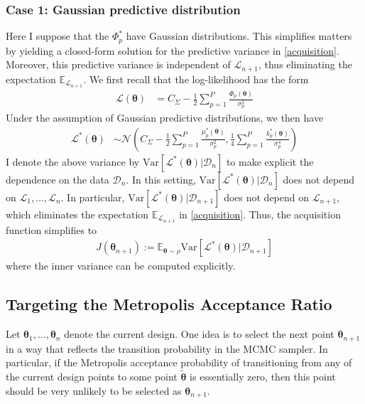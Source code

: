 \documentclass[12pt]{article}
\newcommand{\E}{\mathbb{E}}
\newcommand{\Var}{\mathrm{Var}}
\newcommand{\btheta}{\boldsymbol{\theta}}
\begin{document}
\subsubsection{Case 1: Gaussian predictive distribution}
Here I suppose that the $\Phi_p^*$ have Gaussian distributions. This simplifies matters by yielding a closed-form solution for the predictive variance in \ref{acquisition}. Moreover, 
this predictive variance is independent of $\mathcal{L}_{n+1}$, thus eliminating the expectation $\E_{\mathcal{L}_{n+1}}$. We first recall that the log-likelihood has the form 
\begin{align*}
\mathcal{L}(\btheta) &= C_\Sigma - \frac{1}{2} \sum_{p = 1}^{P} \frac{\Phi_p(\btheta)}{\sigma_p^2}
\end{align*} 
Under the assumption of Gaussian predictive distributions, we then have 
\begin{align*}
\mathcal{L}^*(\btheta) &\sim \mathcal{N}\left(C_\Sigma - \frac{1}{2} \sum_{p = 1}^{P} \frac{\mu^*_p(\btheta)}{\sigma_p^2}, \frac{1}{4} \sum_{p = 1}^{P} \frac{k^*_p(\btheta)}{\sigma_p^4}  \right)
\end{align*}
I denote the above variance by $\Var\left[\mathcal{L}^*(\btheta) | \mathcal{D}_n \right]$ to make explicit the dependence on the data $\mathcal{D}_n$. In this setting, 
$\Var\left[\mathcal{L}^*(\btheta) | \mathcal{D}_n \right]$ does not depend on $\mathcal{L}_1, \dots, \mathcal{L}_n$. In particular, $\Var\left[\mathcal{L}^*(\btheta) | \mathcal{D}_{n+1} \right]$
does not depend on $\mathcal{L}_{n+1}$, which eliminates the expectation $\E_{\mathcal{L}_{n+1}}$ in \ref{acquisition}. 
Thus, the acquisition function simplifies to 
\begin{align}
J(\btheta_{n+1}) := \E_{\btheta \sim \rho} \Var\left[\mathcal{L}^*(\btheta) | \mathcal{D}_{n+1} \right] \label{acquisition_Gaussian_case}
\end{align}
where the inner variance can be computed explicitly. 


\subsection{Targeting the Metropolis Acceptance Ratio}
Let $\btheta_1, \dots, \btheta_n$ denote the current design. One idea is to select the next point $\btheta_{n + 1}$ in a way that reflects the transition probability in the MCMC sampler. 
In particular, if the Metropolis acceptance probability of transitioning from any of the current design points to some point $\tilde{\btheta}$ is essentially zero, then this point should be 
very unlikely to be selected as $\btheta_{n + 1}$. 
\end{document}

